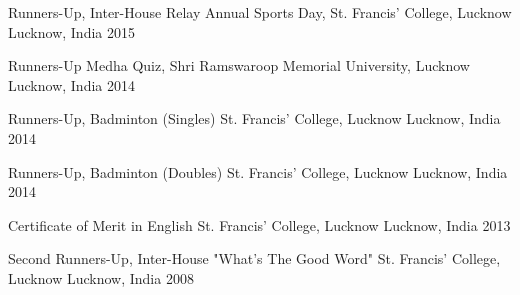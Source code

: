 



\begin{cvhonors}

  \cvhonor
    {Runners-Up, Inter-House Relay} %
    {Annual Sports Day, St. Francis' College, Lucknow} %
    {Lucknow, India} %
    {2015} %


  \cvhonor
    {Runners-Up} %
    {Medha Quiz, Shri Ramswaroop Memorial University, Lucknow} %
    {Lucknow, India} %
    {2014} %

  \cvhonor
    {Runners-Up, Badminton (Singles)} %
    {St. Francis' College, Lucknow} %
    {Lucknow, India} %
    {2014} %

  \cvhonor
    {Runners-Up, Badminton (Doubles)} %
    {St. Francis' College, Lucknow} %
    {Lucknow, India} %
    {2014} %

  \cvhonor
    {Certificate of Merit in English} %
    {St. Francis' College, Lucknow} %
    {Lucknow, India} %
    {2013} %

  \cvhonor
    {Second Runners-Up, Inter-House "What's The Good Word"} %
    {St. Francis' College, Lucknow} %
    {Lucknow, India} %
    {2008} %


\end{cvhonors}




